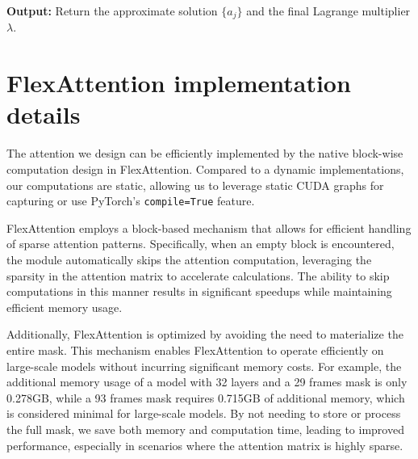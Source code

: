 \noindent\textbf{Output:} Return the approximate solution $\{a_j\}$ and the final Lagrange multiplier $\lambda$.

\section{FlexAttention implementation details}
\label{appendix:flex_attention}
The attention we design can be efficiently implemented by the native block-wise computation design in FlexAttention. %
Compared to a dynamic implementations, our computations are static, allowing us to leverage static CUDA graphs for capturing or use PyTorch's \texttt{compile=True} feature. %

FlexAttention employs a block-based mechanism that allows for efficient handling of sparse attention patterns. Specifically, when an empty block is encountered, the module automatically skips the attention computation, leveraging the sparsity in the attention matrix to accelerate calculations. The ability to skip computations in this manner results in significant speedups while maintaining efficient memory usage. %

Additionally, FlexAttention is optimized by avoiding the need to materialize the entire mask. This mechanism enables FlexAttention to operate efficiently on large-scale models without incurring significant memory costs. For example, the additional memory usage of a model with 32 layers and a 29 frames mask is only 0.278GB, while a 93 frames mask requires 0.715GB of additional memory, which is considered minimal for large-scale models. By not needing to store or process the full mask, we save both memory and computation time, leading to improved performance, especially in scenarios where the attention matrix is highly sparse.

